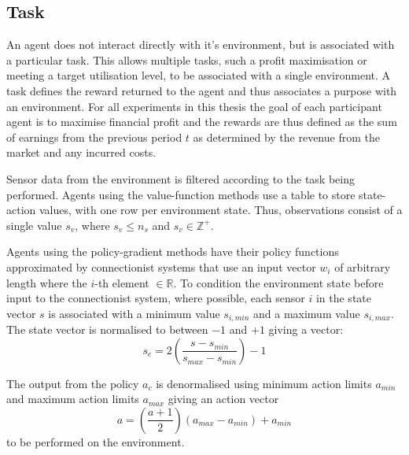 \subsection{Task}
An agent does not interact directly with it's environment, but is associated
with a particular task.  This allows multiple tasks, such a profit
maximisation or meeting a target utilisation level, to be associated with a
single environment.  A task defines the reward returned to the agent and
thus associates a purpose with an environment.  For all experiments in this
thesis the goal of each participant agent is to maximise financial profit and
the rewards are thus defined as the sum of earnings from the previous period
$t$ as determined by the revenue from the market and any incurred costs.

Sensor data from the environment is filtered according to the task being
performed.  Agents using the value-function methods use a table to store
state-action values, with one row per environment state.  Thus, observations
consist of a single value $s_v$, where $s_v \leq n_s$ and $s_v \in
\mathbb{Z}^+$.

Agents using the policy-gradient methods have their policy functions
approximated by connectionist systems that use an input vector $w_i$ of
arbitrary length where the $i$-th element $\in \mathbb{R}$.  To condition the
environment state before input to the connectionist system, where possible,
each sensor $i$ in the state vector $s$ is associated with a minimum value
$s_{i,min}$ and a maximum value $s_{i,max}$.   The state vector is normalised
to between $-1$ and $+1$ giving a vector:
\begin{equation}
s_c = 2\left(\frac{s - s_{min}}{s_{max} - s_{min}}\right) - 1
\end{equation}

The output from the policy $a_c$ is denormalised using minimum action limits
$a_{min}$ and maximum action limits $a_{max}$ giving an action vector
\begin{equation}
a = \left(\frac{a + 1}{2}\right)(a_{max} - a_{min}) + a_{min}
\end{equation}
to be performed on the environment.

